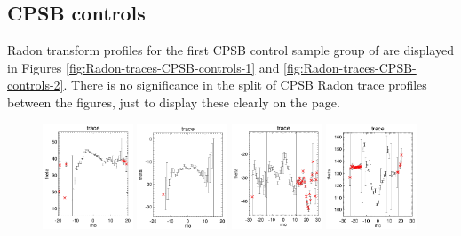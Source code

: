 \documentclass[fleqn,usenatbib]{mnras}
\begin{document}
\subsection{CPSB controls}
Radon transform profiles for the first CPSB control sample group of are displayed in Figures \ref{fig:Radon-traces-CPSB-controls-1} and \ref{fig:Radon-traces-CPSB-controls-2}. There is no significance in the split of CPSB Radon trace profiles between the figures, just to display these clearly on the page.

\begin{figure}
    \centering
    \includegraphics[width=0.24\textwidth]{Images/trace-plots/trace-plots-cpsb-controls/8084-6103.png}
    \includegraphics[width=0.24\textwidth]{Images/trace-plots/trace-plots-cpsb-controls/8262-3703.png}
    \includegraphics[width=0.24\textwidth]{Images/trace-plots/trace-plots-cpsb-controls/8262-12701.png}
    \includegraphics[width=0.24\textwidth]{Images/trace-plots/trace-plots-cpsb-controls/8335-12704.png}

\end{figure}
\end{document}
